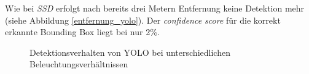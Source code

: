 Wie bei \textit{SSD} erfolgt nach bereits drei Metern Entfernung keine Detektion mehr (siehe Abbildung \ref{entfernung_yolo}). Der \textit{confidence score} für die korrekt erkannte Bounding Box liegt bei nur 2\%.
 
\begin{figure}[H]
 	\hfill
 	\hfill
 	\hfill
 	\caption{Detektionsverhalten von YOLO bei unterschiedlichen Beleuchtungsverhältnissen}
 	\label{sicht_yolo}
\end{figure}

